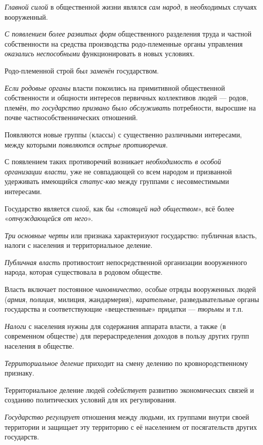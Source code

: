 \documentclass[a4paper,14pt,russian]{extreport}
\begin{document}
\emph{Главной силой} в общественной жизни являлся \emph{сам народ}, в необходимых случаях вооруженный.

\emph{С появлением более развитых форм} общественного разделения труда и частной собственности на средства производства родо-племенные органы управления \emph{оказались неспособными} функционировать в новых условиях.

Родо-племенной строй \emph{был заменён} государством.

\emph{Если родовые органы} власти покоились на примитивной общественной собственности и общности интересов первичных коллективов людей --- родов, племён, \emph{то государство призвано было обслуживать} потребности, выросшие на почве частнособственнических отношений.

Появляются новые группы (классы) с существенно различными интересами, между которыми \emph{появляются острые противоречия}.

С появлением таких противоречий возникает \emph{необходимость в особой организации власти}, уже не совпадающей со всем народом и призванной удерживать имеющийся \emph{статус-кво} между группами с несовместимыми интересами.

Государство является \emph{силой}, как бы «\emph{стоящей над обществом}», всё более «\emph{отчуждающейся от него}».

\emph{Три} \emph{основные черты} или признака характеризуют государство: публичная власть, налоги с населения и территориальное деление.

\emph{Публичная власть} противостоит непосредственной организации вооруженного народа, которая существовала в родовом обществе.

Власть включает постоянное \emph{чиновничество}, особые отряды вооруженных людей (\emph{армия}, \emph{полиция}, милиция, жандармерия), \emph{карательные}, разведывательные органы государства и соответствующие «вещественные» придатки --- \emph{тюрьмы} и т.п.

\emph{Налоги} с населения нужны для содержания аппарата власти, а также (в современном обществе) для перераспределения доходов в пользу других групп населения в обществе.

\emph{Территориальное деление} приходит на смену делению по кровнородственному признаку.

Территориальное деление людей \emph{содействует} развитию экономических связей и созданию политических условий для их регулирования.

\emph{Государство регулирует} отношения между людьми, их группами внутри своей территории и защищает эту территорию с её населением от посягательств других государств.
\end{document}
